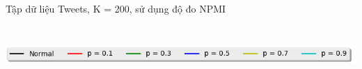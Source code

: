 \documentclass[pdf]{beamer}
\begin{document}
\begin{frame}{Tập dữ liệu Tweets, K = 200, sử dụng độ đo NPMI }
\begin{columns}[T] %
	\begin{column}{.50\textwidth}
		\begin{figure}
		\end{figure}
	\end{column} %
	\hfill%
	\begin{column}{.50\textwidth}
		\begin{figure}
		\end{figure}				
	\end{column} %
\end{columns}
\begin{center}
	\includegraphics[width=1\textwidth]{menu.png}	
\end{center}
\end{frame}
\end{document}
